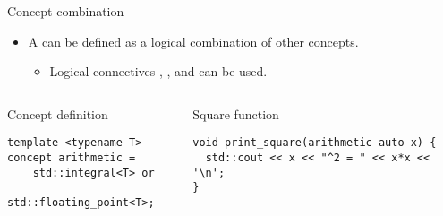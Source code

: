\begin{frame}[t,fragile]{Concept combination}
\begin{itemize}
  \item A  can be defined as a logical combination of other concepts.
    \begin{itemize}
      \item Logical connectives , , and  can be used.
    \end{itemize}
\end{itemize}

\begin{columns}[T]

\begin{block}{Concept definition}
\begin{lstlisting}
template <typename T>
concept arithmetic = 
    std::integral<T> or 
    std::floating_point<T>;
\end{lstlisting}
\end{block}

\pause
{}
\begin{block}{Square function}
\begin{lstlisting}
void print_square(arithmetic auto x) {
  std::cout << x << "^2 = " << x*x << '\n';
}
\end{lstlisting}
\end{block}

\end{columns}
\end{frame}

